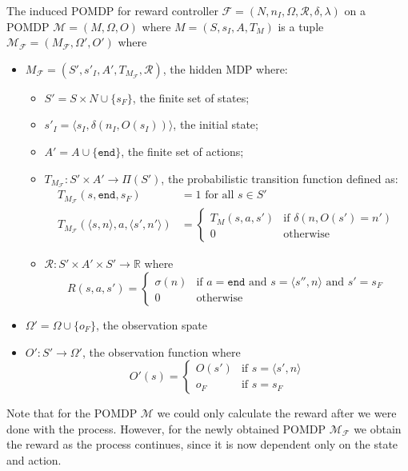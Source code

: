 \begin{definition}
	\label{def:reward-mdp}
	The induced POMDP for reward controller $\mathcal{F}=(N, n_I, \Omega, \mathcal{R}, \delta, \lambda)$ on a POMDP $\mathcal{M}=(M,\Omega,O)$ where $M=(S,s_I,A,T_{M})$ is a tuple $\mathcal{M_\mathcal{F}}=(M_\mathcal{F},\Omega',O')$ where 
	\begin{itemize}
		\item $M_\mathcal{F} = (S',s'_I,A',T_{M_\mathcal{F}},\mathcal{R})$, the hidden MDP where:
		\begin{itemize}
			\item $S'=S\times N \cup \{s_F\}$, the finite set of states;
			\item $s'_I = \langle s_I, \delta(n_I, O(s_I))\rangle$, the initial state;
			\item $A'=A\cup \{\texttt{end}\}$, the finite set of actions;
			\item $T_{M_\mathcal{F}}:S'\times A' \to \Pi(S')$, the probabilistic transition function defined as:
				\begin{align*}				
					T_{M_\mathcal{F}}(s,\texttt{end},s_F) &= 1 \text{ for all } s\in S'\\
					T_{M_\mathcal{F}}(\langle s,n\rangle,a,\langle s',n'\rangle) &= \begin{cases}
						T_M(s,a,s') & \text{if } \delta(n,O(s')=n') \\
						0 & \text{otherwise}
					\end{cases}
				\end{align*}
			\item $\mathcal{R}:S'\times A'\times S' \to \mathbb{R}$ where 
                \begin{equation*}
					R(s,a,s') = \begin{cases}
					\sigma(n) & \text{if } a=\texttt{end} \text{ and } s=\langle s'',n\rangle \text{ and } s'=s_F\\
					0 & \text{otherwise} 
					\end{cases}
				\end{equation*}
		\end{itemize}
		\item $\Omega'=\Omega \cup \{o_F\}$, the observation spate
		\item $O':S'\to \Omega'$, the observation function where
			\begin{equation*}
				O'(s)= \begin{cases}
				O(s') & \text{if } s=\langle s',n\rangle\\
				o_F & \text{if } s=s_F
				\end{cases}
			\end{equation*}
		\end{itemize}
\end{definition}

Note that for the POMDP $\mathcal{M}$ we could only calculate the reward after we were done with the process. However, for the newly obtained POMDP $\mathcal{M}_{\mathcal{F}}$ we obtain the reward as the process continues, since it is now dependent only on the state and action.